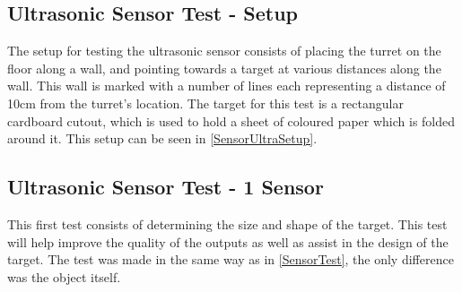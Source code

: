 \subsection{Ultrasonic Sensor Test - Setup}\label{UltraTestSetup}
The setup for testing the ultrasonic sensor consists of placing the turret on
the floor along a wall, and pointing towards a target at various distances along
the wall. This wall is marked with a number of lines each representing a
distance of 10cm from the turret's location. The target for this test is a
rectangular cardboard cutout, which is used to hold a sheet of coloured paper
which is folded around it. This setup can be seen in
\autoref{SensorUltraSetup}.


\subsection{Ultrasonic Sensor Test - 1 Sensor}\label{UltraTestPlacement}
This first test consists of determining the size and shape of the target. This
test will help improve the quality of the outputs as well as assist in the
design of the target. The test was made in the same way as in
\autoref{SensorTest}, the only difference was the object itself.\nl


% 
% 

